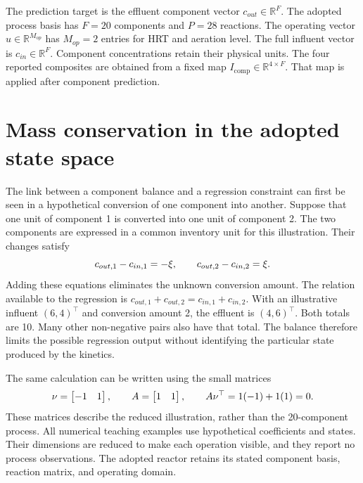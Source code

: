 The prediction target is the effluent component vector \(c_{out}\in\mathbb{R}^{F}\). The adopted process basis has \(F=20\) components and \(P=28\) reactions. The operating vector \(u\in\mathbb{R}^{M_{op}}\) has \(M_{op}=2\) entries for HRT and aeration level. The full influent vector is \(c_{in}\in\mathbb{R}^{F}\). Component concentrations retain their physical units. The four reported composites are obtained from a fixed map \(I_{\mathrm{comp}}\in\mathbb{R}^{4\times F}\). That map is applied after component prediction.

\section{Mass conservation in the adopted state space}

The link between a component balance and a regression constraint can first be seen in a hypothetical conversion of one component into another. Suppose that one unit of component 1 is converted into one unit of component 2. The two components are expressed in a common inventory unit for this illustration. Their changes satisfy
\begin{equation}
\equationname{Illustrative component changes for a two-component reaction}
\label{eq:icsor_scalar_inventory_example}
c_{out,1}-c_{in,1}=-\xi,
\qquad
c_{out,2}-c_{in,2}=\xi.
\end{equation}
Adding these equations eliminates the unknown conversion amount. The relation available to the regression is \(c_{out,1}+c_{out,2}=c_{in,1}+c_{in,2}\). With an illustrative influent \((6,4)^\top\) and conversion amount 2, the effluent is \((4,6)^\top\). Both totals are 10. Many other non-negative pairs also have that total. The balance therefore limits the possible regression output without identifying the particular state produced by the kinetics.

The same calculation can be written using the small matrices
\begin{equation}
\equationname{Illustrative stoichiometric matrix and mass conservation operator}
\label{eq:icsor_small_inventory_matrices}
\nu=\begin{bmatrix}-1&1\end{bmatrix},
\qquad
A=\begin{bmatrix}1&1\end{bmatrix},
\qquad
A\nu^\top=1(-1)+1(1)=0.
\end{equation}
These matrices describe the reduced illustration, rather than the 20-component process. All numerical teaching examples use hypothetical coefficients and states. Their dimensions are reduced to make each operation visible, and they report no process observations. The adopted reactor retains its stated component basis, reaction matrix, and operating domain.


